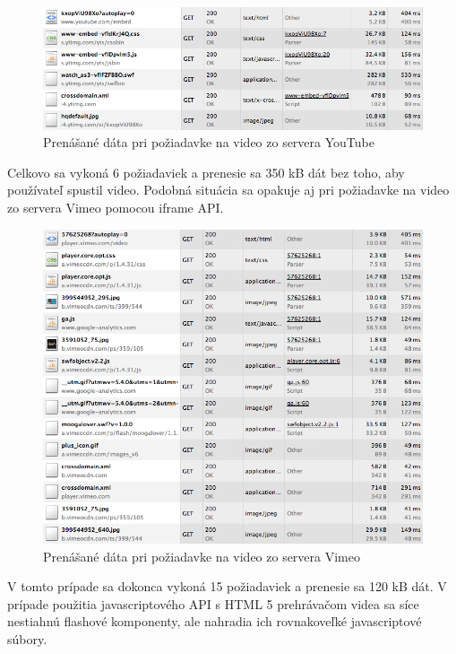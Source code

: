 \begin{figure}[H]
	\centering
	\includegraphics[width=1.0\textwidth]{img/youtube.png}
	\caption[Prenášané dáta pri požiadavke na video zo servera YouTube]{
		Prenášané dáta pri požiadavke na video zo servera YouTube}
	\label{fig: youtube}
\end{figure}

Celkovo sa vykoná 6 požiadaviek a prenesie sa 350 kB dát bez toho, aby používateľ spustil video. Podobná situácia sa opakuje aj pri požiadavke na video zo servera Vimeo pomocou iframe API.

\newpage
\begin{figure}[H]
	\centering
	\includegraphics[width=1.0\textwidth]{img/vimeo.png}
	\caption[Prenášané dáta pri požiadavke na video zo servera Vimeo]{
		Prenášané dáta pri požiadavke na video zo servera Vimeo}
	\label{fig: vimeo}
\end{figure}

V tomto prípade sa dokonca vykoná 15 požiadaviek a prenesie sa 120 kB dát. V prípade použitia javascriptového API s HTML 5 prehrávačom videa sa síce nestiahnú flashové komponenty, ale nahradia ich rovnakoveľké javascriptové súbory.

